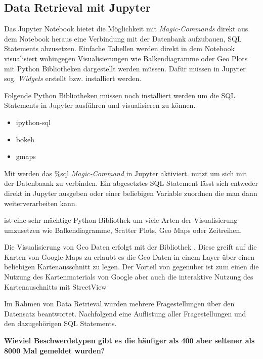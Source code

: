 \subsection{Data Retrieval mit Jupyter}
Das Jupyter Notebook bietet die Möglichkeit mit \textit{Magic-Commands} direkt aus dem Notebook heraus
eine Verbindung mit der Datenbank aufzubauen, \ac{SQL} Statements abzusetzen.
Einfache Tabellen werden direkt in dem Notebook visualisiert wohingegen Visualisierungen wie \zb
Balkendiagramme oder Geo Plots mit Python Bibliotheken dargestellt werden müssen.
Dafür müssen in Jupyter sog. \textit{Widgets} erstellt bzw. installiert werden.

Folgende Python Bibliotheken müssen noch installiert werden um die \ac{SQL} Statements in Jupyter ausführen und visualisieren zu können.
\begin{itemize}
  \item ipython-sql
  \item bokeh
  \item gmaps
\end{itemize}

Mit  werden das \%sql \textit{Magic-Command} in Jupyter aktiviert.
 nutzt  um sich mit der Datenbaank zu verbinden.
Ein abgesetztes \ac{SQL} Statement lässt sich entweder direkt in Jupyter ausgeben
oder einer beliebigen Variable zuordnen die man dann weiterverarbeiten kann.

  ist eine sehr mächtige Python Bibliothek um viele Arten der Visualisierung umzusetzen
 wie \zb Balkendiagramme, Scatter Plots, Geo Maps oder Zeitreihen.

 Die Visualisierung von Geo Daten erfolgt mit der Bibliothek .
 Diese greift auf die Karten von Google Maps zu erlaubt es die Geo Daten in einem Layer über einen
 beliebigen Kartenausschnitt zu legen.
 Der Vorteil von  gegenüber  ist
 zum einen die Nutzung des Kartenmaterials von Google aber auch die interaktive Nutzung
 des Kartenauschnitts mit \zb StreetView


Im Rahmen von Data Retrieval wurden mehrere Fragestellungen über den Datensatz beantwortet.
Nachfolgend eine Auflistung aller Fragestellungen und den dazugehörigen \ac{SQL} Statements.


\textbf{Wieviel Beschwerdetypen gibt es die häufiger als 400 aber seltener als 8000 Mal gemeldet wurden?}
\newline
{}


